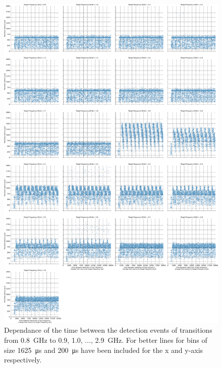 \begin{figure}[]
    \centering
    \includegraphics[width=\columnwidth]{fig/ftalat_scatter_wait_transition_latency_hati_source_0.8.pdf}
    \caption{Dependance of the time between the detection events of transitions from \SI{0.8}{\GHz} to \SI{0.9}{}, \SI{1.0}{}, ..., \SI{2.9}{\GHz}. For better lines for bins of size \SI{1625}{\us} and \SI{200}{\us} have been included for the x and y-axis respectively.}
\end{figure}
